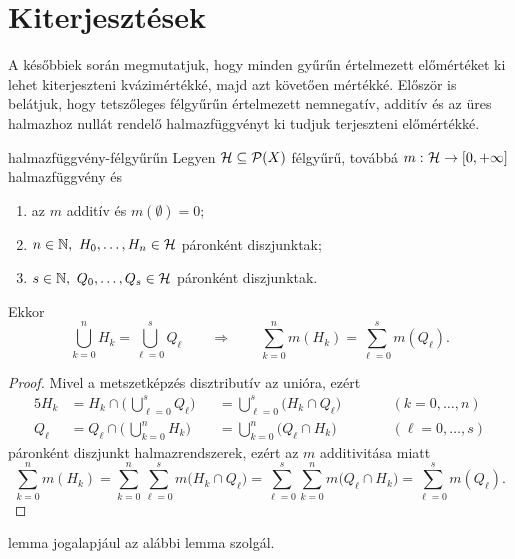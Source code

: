 \documentclass[
]{elteikthesis}[2024/04/26]
\begin{document}
	\section{Kiterjesztések}
	
	A későbbiek során megmutatjuk, 
	hogy minden gyűrűn értelmezett előmértéket ki lehet kiterjeszteni kvázimértékké, majd azt követően mértékké. 
	Először is belátjuk, hogy tetszőleges félgyűrűn értelmezett nemnegatív, 
	additív és az üres halmazhoz nullát rendelő halmazfüggvényt ki tudjuk terjeszteni előmértékké.
	
	\begin{lemma}{}{halmazfüggvény-félgyűrűn}
		Legyen \( \mathcal{H} \subseteq \mathcal{P}( X ) \) félgyűrű, 
		továbbá \( m \,\colon \mathcal{H} \to [0, +\infty] \) halmazfüggvény és
		\begin{enumerate}[label=\roman*)]
			\item az \( m \) additív és \( m(\emptyset) = 0 \);
			\item \( n \in \mathbb{N}, \ H_0, \dots, H_n \in \mathcal{H} \) páronként diszjunktak;
			\item \( s \in \mathbb{N}, \ Q_0, \dots, Q_s \in \mathcal{H} \) páronként diszjunktak.
		\end{enumerate}
		Ekkor
		\[
			\bigcup_{k=0}^n \! H_k = \bigcup_{\ell=0}^s Q_\ell
			\qquad \Longrightarrow \qquad
			\sum_{k=0}^{n} m( H_k ) = \sum_{\ell=0}^{s} m( Q_\ell ).
		\]
	\end{lemma}
	\begin{proof}
		Mivel a metszetképzés disztributív az unióra, ezért
		\begin{alignat*}{5}
			H_k &= 
			H_k \cap \Biggl( \, \bigcup_{\ell=0}^s Q_\ell \Biggr) &&=
			\bigcup_{\ell=0}^s \bigl( H_k \cap Q_\ell \bigr) \qquad &&(k=0,\dots,n) \\[6pt]
			Q_\ell &= 
			Q_\ell \cap \Biggl( \, \bigcup_{k=0}^n H_k \Biggr) &&=
			\bigcup_{k=0}^n \bigl( Q_\ell \cap H_k \bigr) &&(\ell=0,\dots,s)
		\end{alignat*}
		páronként diszjunkt halmazrendszerek, ezért az \( m \) additivitása miatt
		\[
			\sum_{k=0}^n m( H_k ) =
			\sum_{k=0}^n \sum_{\ell=0}^s m \bigl( H_k \cap Q_\ell \bigr) =
			\sum_{\ell=0}^s \sum_{k=0}^n  m \bigl( Q_\ell \cap H_k \bigr) =
			\sum_{\ell=0}^s m( Q_\ell ).
		\]
	\end{proof}
	
	\noindent
	 lemma jogalapjául az alábbi lemma szolgál.
	
\end{document}

